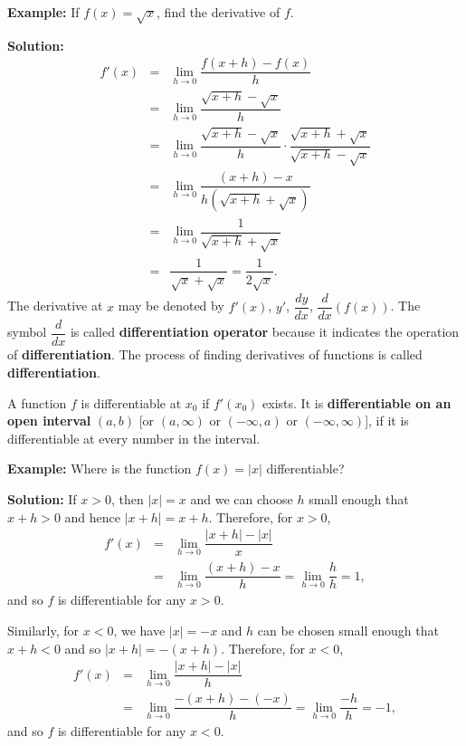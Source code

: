 \documentclass[titlepage,a4paper,12pt]{report}
\begin{document}
\noindent \textbf{Example:} If $f(x)=\sqrt{x}$, find the derivative of $f$.

\noindent \textbf{Solution:} 
\begin{eqnarray*}
f'(x) &=& \lim _{h\rightarrow 0} \dfrac{f(x+h)-f(x)}{h}\\
&=& \lim _{h\rightarrow 0} \dfrac{\sqrt{x+h}-\sqrt{x}}{h}\\
&=& \lim _{h\rightarrow 0} \dfrac{\sqrt{x+h}-\sqrt{x}}{h} \cdot \dfrac{\sqrt{x+h}+\sqrt{x}}{\sqrt{x+h}-\sqrt{x}}\\
&=& \lim _{h\rightarrow 0} \dfrac{(x+h)-x}{h(\sqrt{x+h}+\sqrt{x})}\\
&=& \lim _{h\rightarrow 0} \dfrac{1}{\sqrt{x+h}+\sqrt{x}}\\
&=& \dfrac{1}{\sqrt{x} +\sqrt{x}} =\dfrac{1}{2\sqrt{x}}. 
\end{eqnarray*}
\noindent The derivative at $x$ may be denoted by $f'(x)$, $y'$, $\dfrac{dy}{dx}$, $\dfrac{d}{dx}(f(x))$. The symbol $\dfrac{d}{dx}$ is called \textbf{differentiation operator} because it indicates the operation of \textbf{differentiation}. The process of finding derivatives of functions is called \textbf{differentiation}.

\noindent  A function $f$ is differentiable at $x_0$ if $f'(x_0)$ exists. It is \textbf{differentiable on an open interval} $(a,b)$ [or $(a,\infty)$ or $(-\infty , a)$ or $(-\infty , \infty)$], if it is differentiable at every number in the interval.

\noindent \textbf{Example:} Where is the function $f(x)=|x|$ differentiable?

\noindent \textbf{Solution:} If $x>0$, then $|x|=x$ and we can choose $h$ small enough that $x+h>0$ and hence $|x+h|=x+h$. Therefore, for $x>0$, 
\begin{eqnarray*}
f'(x) &=& \lim _{h\rightarrow 0}\dfrac{|x+h|-|x|}{x}\\
&=&\lim _{h\rightarrow 0} \dfrac{(x+h)-x}{h}=\lim _{h\rightarrow 0}\dfrac{h}{h}=1,
\end{eqnarray*}
and so $f$ is differentiable for any $x>0$. 

\noindent Similarly, for $x<0$, we have $|x|=-x$ and $h$ can be chosen small enough that $x+h<0$ and so $|x+h|=-(x+h)$. Therefore, for $x<0$, 
\begin{eqnarray*}
f'(x) &=& \lim _{h\rightarrow 0}\dfrac{|x+h|-|x|}{h}\\
&=& \lim _{h\rightarrow 0}\dfrac{-(x+h)-(-x)}{h} =\lim _{h\rightarrow 0} \dfrac{-h}{h}=-1,
\end{eqnarray*} 
and so $f$ is differentiable for any $x<0$. 
\end{document}
